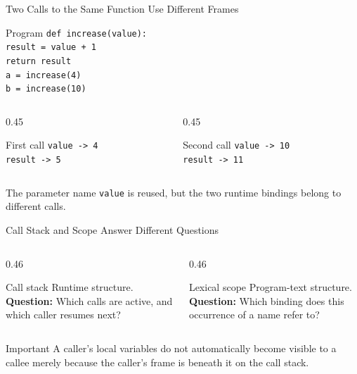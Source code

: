 \documentclass[aspectratio=169,10pt]{beamer}
\begin{document}
\begin{frame}{Two Calls to the Same Function Use Different Frames}
  \begin{block}{Program}
    \texttt{def increase(value):}\\
    \hspace*{0.20in}\texttt{result = value + 1}\\
    \hspace*{0.20in}\texttt{return result}\\[0.08in]
    \texttt{a = increase(4)}\\
    \texttt{b = increase(10)}
  \end{block}

  \begin{columns}[T,onlytextwidth]
    \begin{column}{0.45\textwidth}
      \begin{block}{First call}
        \texttt{value -> 4}\\
        \texttt{result -> 5}
      \end{block}
    \end{column}

    \begin{column}{0.45\textwidth}
      \begin{block}{Second call}
        \texttt{value -> 10}\\
        \texttt{result -> 11}
      \end{block}
    \end{column}
  \end{columns}

  The parameter name \texttt{value} is reused, but the two runtime bindings belong to different calls.
\end{frame}

\begin{frame}{Call Stack and Scope Answer Different Questions}
  \begin{columns}[T,onlytextwidth]
    \begin{column}{0.46\textwidth}
      \begin{block}{Call stack}
        Runtime structure.\\[0.08in]
        \textbf{Question:} Which calls are active, and which caller resumes next?
      \end{block}
    \end{column}

    \begin{column}{0.46\textwidth}
      \begin{block}{Lexical scope}
        Program-text structure.\\[0.08in]
        \textbf{Question:} Which binding does this occurrence of a name refer to?
      \end{block}
    \end{column}
  \end{columns}

  \begin{alertblock}{Important}
    A caller's local variables do not automatically become visible to a callee merely because the caller's frame is beneath it on the call stack.
  \end{alertblock}
\end{frame}
\end{document}
